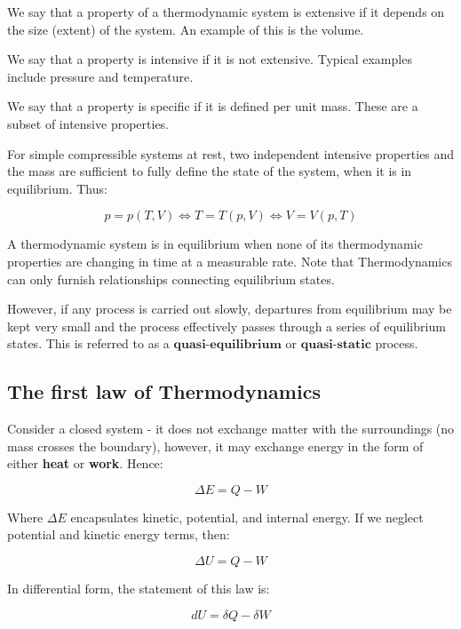 \documentclass{article}
\begin{document}
\begin{definition}
    We say that a property of a thermodynamic system is extensive if it depends on the size (extent) of the system. An example of this is the volume.
\end{definition}

\begin{definition}
    We say that a property is intensive if it is not extensive. Typical examples include pressure and temperature.
\end{definition}

\begin{definition}
    We say that a property is specific if it is defined per unit mass. These are a subset of intensive properties.
\end{definition}

\begin{proposition}
    For simple compressible systems at rest, two independent intensive properties and the mass are sufficient to fully define the state of the system, when it is in equilibrium. Thus:

    \[ p = p(T, V) \iff T = T(p, V) \iff V = V(p, T) \]
\end{proposition}

\begin{definition}
    A thermodynamic system is in equilibrium when none of its thermodynamic properties are changing in time at a measurable rate. Note that Thermodynamics can only furnish relationships connecting equilibrium states.

    However, if any process is carried out slowly, departures from equilibrium may be kept very small and the process effectively passes through a series of equilibrium states. This is referred to as a $\textbf{quasi-equilibrium}$ or $\textbf{quasi-static}$ process.
\end{definition}

\newpage

\subsection{The first law of Thermodynamics}

\begin{theorem}

Consider a closed system - it does not exchange matter with the surroundings (no mass crosses the  boundary), however, it may exchange energy in the form of either \textbf{heat} or \textbf{work}. Hence:

\[ \Delta E = Q - W \]

Where $\Delta E$ encapsulates kinetic, potential, and internal energy. If we neglect potential and kinetic energy terms, then:

\[ \Delta U = Q - W \]

In differential form, the statement of this law is:

\[ dU = \delta Q - \delta W \]
    
\end{theorem}
\end{document}

